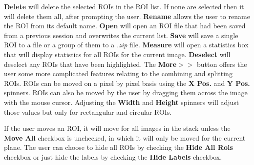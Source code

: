 \documentclass{article}
\begin{document}
	\textbf{Delete} will delete the selected ROIs in the ROI list.
	If none are selected then it will delete them all, after prompting the user. \textbf{Rename}
	allows the user to rename the ROI from its default name.
	\textbf{Open} will open an ROI file that had been saved from a previous session and overwrites the current list.
	\textbf{Save} will save a single ROI to a file or a group of them to a \textit{.zip} file.
	\textbf{Measure} will open a statistics box that will display statistics for all ROIs for
	the current image. \textbf{Deselect} will deselect any ROIs that have been highlighted. The
	\textbf{More$>>$} button offers the user some more complicated features relating to the 
	combining and splitting ROIs. ROIs can be moved on a pixel by pixel basis using the 
	\textbf{X Pos.} and \textbf{Y Pos.} spinners. ROIs can also be moved by the user by 
	dragging them across the image with the mouse cursor. Adjusting the \textbf{Width} and
	\textbf{Height} spinners will adjust those values but only for rectangular and circular ROIs.

	If the user moves an ROI, it will move for all images in the stack 
	unless the \textbf{Move All} checkbox is unchecked, in which it will 
	only be moved for the current plane. The user can choose to hide all
	ROIs by checking the \textbf{Hide All Rois} checkbox or just hide the labels
	by checking the \textbf{Hide Labels} checkbox.
   

\newpage
\end{document}
